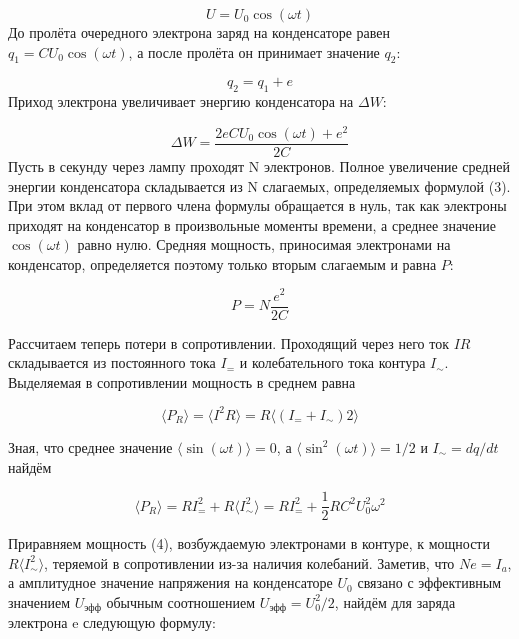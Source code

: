 \documentclass[a4paper, 12pt]{article}%
\begin{document}
	\begin{equation}
		U = U_0 \cos(\omega t) 
	\end{equation}
	До пролёта очередного электрона заряд на конденсаторе равен
	$q_1 = CU_0 \cos(\omega t)$, а после пролёта он принимает значение $q_2$:
	
	\begin{equation}
	q_2 = q_1 + e
	\end{equation}
	Приход электрона увеличивает энергию конденсатора на $\Delta W$:
	
	\begin{equation}
		\Delta W = \frac{2eCU_0\cos(\omega t) + e^2}{2C}
	\end{equation}
	Пусть в секунду через лампу проходят N электронов. Полное увеличение средней энергии конденсатора складывается из N слагаемых,
	определяемых формулой (3). При этом вклад от первого члена формулы обращается в нуль, так как электроны приходят на конденсатор в произвольные моменты времени, а среднее значение $\cos(\omega t)$ равно нулю.
	Средняя мощность, приносимая электронами на конденсатор, определяется поэтому только вторым слагаемым и равна $P$:
	 
	\begin{equation}
		P = N \frac{e^2}{2C} 
	\end{equation}
	
	Рассчитаем теперь потери в сопротивлении. Проходящий через него
	ток $IR$ складывается из постоянного тока $I_=$ и колебательного тока контура $I_{\sim}$. Выделяемая в сопротивлении мощность в среднем равна
	
	\begin{equation}
		\langle P_R \rangle = \langle I^2R \rangle = R \langle(I_= + I_{\sim})2 \rangle
	\end{equation}
	
	Зная, что среднее значение $\langle \sin(\omega t) \rangle = 0$, а
	$\langle \sin^2(\omega t) \rangle = 1/2$ и $I_{\sim} = dq/dt $ найдём
	
	\begin{equation}
		\langle P_R \rangle = RI^2_= + R\langle I^2_{\sim} \rangle = RI^2_= + \frac{1}{2} RC^2U_0^2\omega^2
	\end{equation}
	
	Приравняем мощность (4), возбуждаемую электронами в контуре, к
	мощности  $R\langle I^2_{\sim} \rangle$, теряемой в сопротивлении из-за наличия колебаний. Заметив, что $Ne = I_a$, а амплитудное значение напряжения на конденсаторе $U_0$ связано с эффективным значением $U_{\text{эфф}}$ обычным соотношением $U_{\text{эфф}} = U_0^2/2$, найдём для заряда электрона e следующую формулу:
	
\end{document}
